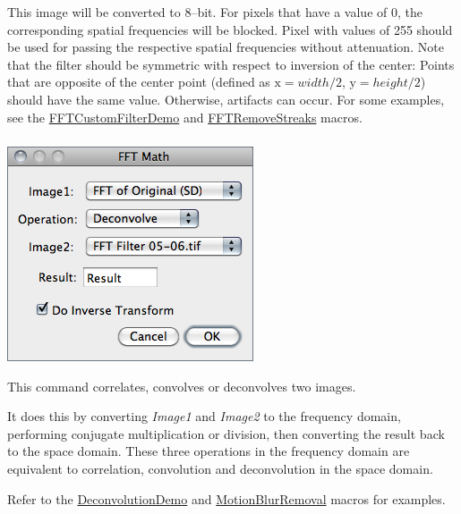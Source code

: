 This image will be converted to 8--bit. For pixels that have a value
of 0, the corresponding spatial frequencies will be blocked. Pixel
with values of 255 should be used for passing the respective spatial
frequencies without attenuation. Note that the filter should be symmetric
with respect to inversion of the center: Points that are opposite
of the center point (defined as $\mbox{x}=width/2$, $\mbox{y}=height/2$)
should have the same value. Otherwise, artifacts can occur. For some
examples, see the \href{http://imagej.nih.gov/ij/macros/FFTCustomFilterDemo.txt}{FFTCustomFilterDemo}
and \href{http://imagej.nih.gov/ij/macros/FFTRemoveStreaks.txt}{FFTRemoveStreaks}
macros.


\subsubsection{\protect{}}

\begin{minipage}[c][1\totalheight][t]{0.39\columnwidth}%
\includegraphics[scale=0.55]{images/FFTMath}%
\end{minipage}%
\begin{minipage}[c][1\totalheight][t]{0.61\columnwidth}%
This command correlates, convolves or deconvolves two images. \medskip{}


It does this by converting \emph{Image1} and \emph{Image2} to the
frequency domain, performing conjugate multiplication or division,
then converting the result back to the space domain. These three operations
in the frequency domain are equivalent to correlation, convolution
and deconvolution in the space domain.\medskip{}


Refer to the \href{http://imagej.nih.gov/ij/macros/DeconvolutionDemo.txt}{DeconvolutionDemo}
and \href{http://imagej.nih.gov/ij/macros/MotionBlurRemoval.txt}{MotionBlurRemoval}
macros for examples.%
\end{minipage}


